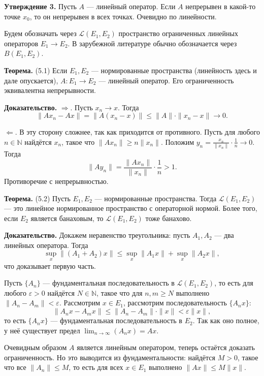 \textbf{Утверждение 3.} Пусть $A$ --- линейный оператор.
Если $A$ непрерывен в какой-то точке $x_0$, то он непрерывен в всех точках.
Очевидно по линейности.

Будем обозначать через $\mathcal L(E_1, E_2)$ пространство ограниченных линейных операторов $E_1 \to E_2$.
В зарубежной литературе обычно обозначается через $B(E_1, E_2)$.

\textbf{Теорема.} (5.1) Если $E_1, E_2$ --- нормированные пространства (линейность здесь и дале опускается), $A: E_1 \to E_2$ --- линейный оператор.
Его ограниченность эквивалентна непрерывности.

\textbf{Доказательство.} $\Rightarrow$. Пусть $x_n \to x$.
Тогда
\[
    \|Ax_n - Ax\| = \|A(x_n - x)\| \le \|A\| \cdot \|x_n - x\| \to 0.
\]

$\Leftarrow$. В эту сторону сложнее, так как приходится от противного.
Пусть для любого $n \in \mathbb N$ найдётся $x_n$, такое что $\|A x_n \| \ge n \|x_n\|$.
Положим $y_n = \frac{x_n}{\|x_n\|} \cdot \frac{1}{n} \to 0$.
Тогда
\[
    \|A y_n\| = \frac{\|A x_n\|}{\|x_n\|} \cdot \frac{1}{n} > 1.
\]
Противоречие с непрерывностью.

\QED

\textbf{Теорема.} (5.2) Пусть $E_1, E_2$ --- нормированные пространства.
Тогда $\mathcal L(E_1, E_2)$ --- это линейное нормированное пространство с операторной нормой.
Более того, если $E_2$ является банаховым, то $\mathcal L(E_1, E_2)$ тоже банахово.

\textbf{Доказательство.} Докажем неравенство треугольника: пусть $A_1, A_2$ --- два линейных оператора.
Тогда
\[
    \sup_x \|(A_1 + A_2) x \| \le \sup_x \|A_1 x\| + \sup_x \|A_2 x\|,
\]
что доказывает первую часть.

Пусть $\{A_n\}$ --- фундаментальная последовательность в $\mathcal L(E_1, E_2)$, то есть для любого $\varepsilon > 0$ найдётся $N \in \mathbb N$, такое что для $n, m \ge N$ выполнено $\|A_n - A_m\| < \varepsilon$.
Рассмотрим $x \in E_1$, рассмотрим последовательность $\{A_n x\}$:
\[
    \|A_n x - A_m x\| \le \|A_n - A_m \| \cdot \|x\| < \varepsilon \|x\|,
\]
то есть $\{A_n x\}$ --- фундаментальная последовательность в $E_2$.
Так как оно полное, у неё существует предел $\lim_{n \to \infty}(A_n x) = Ax$.

Очевидным образом $A$ является линейным оператором, теперь остаётся доказать ограниченность.
Но это выводится из фундаментальности: найдётся $M > 0$, такое что все $\|A_n\| \le M$, то есть для всех $x \in E_1$ выполнено $\|Ax\| \le M\|x\|$.

